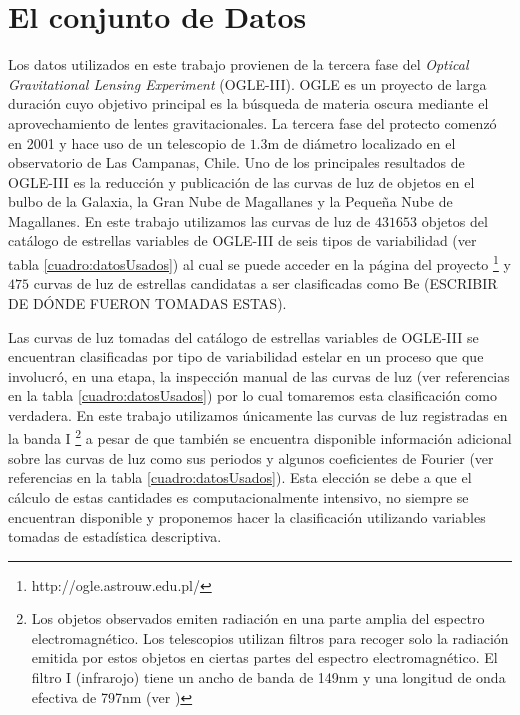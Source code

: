 \documentclass[letterpaper,12pt]{book}
\begin{document}


\section{El conjunto de Datos\label{cap:losDatos}}

Los datos utilizados en este trabajo provienen de la tercera fase del \textit{Optical Gravitational Lensing Experiment} (OGLE-III). OGLE es un proyecto de larga duración cuyo objetivo principal es  la búsqueda de materia oscura mediante el aprovechamiento de lentes gravitacionales. La tercera fase del protecto comenzó en 2001 y hace uso de un telescopio de $1.3$m de diámetro localizado en el observatorio de Las Campanas, Chile\cite{udalski_optical_2004}. Uno de los principales resultados de OGLE-III es la reducción y publicación \cite{udalski_optical_2008} de las curvas de luz de objetos en el bulbo de la Galaxia, la Gran Nube de Magallanes y la Pequeña Nube de Magallanes. En este trabajo utilizamos las curvas de luz de $431 653$ objetos del catálogo de estrellas variables de OGLE-III de seis tipos de variabilidad (ver tabla \ref{cuadro:datosUsados}) al cual se puede acceder en la página del proyecto \footnote{http://ogle.astrouw.edu.pl/} y $475$ curvas de luz de estrellas candidatas a ser clasificadas como Be (ESCRIBIR DE DÓNDE FUERON TOMADAS ESTAS).

Las curvas de luz tomadas del catálogo de estrellas variables de OGLE-III se encuentran clasificadas por tipo de variabilidad estelar en un proceso que que involucró, en una etapa, la inspección manual de las curvas de luz (ver referencias en la tabla \ref{cuadro:datosUsados}) por lo cual tomaremos esta clasificación como verdadera. En este trabajo utilizamos únicamente las curvas de luz registradas en la banda I \footnote{Los objetos observados emiten radiación en una parte amplia del espectro electromagnético. Los telescopios utilizan filtros para recoger solo la radiación emitida por estos objetos en ciertas partes del espectro electromagnético. El filtro I (infrarojo) tiene un ancho de banda de 149nm y una longitud de onda efectiva de 797nm (ver \cite{karttunen_fundamental_2007})} a pesar de que también se encuentra disponible información adicional sobre las curvas de luz como sus periodos y algunos coeficientes de Fourier (ver referencias en la tabla \ref{cuadro:datosUsados}). Esta elección se debe a que el cálculo de estas cantidades es computacionalmente intensivo, no siempre se encuentran disponible y proponemos hacer la clasificación utilizando variables tomadas de estadística descriptiva.
\end{document}
